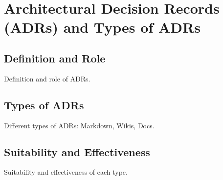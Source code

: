 
\chapter{Architectural Decision Records (ADRs) and Types of ADRs}
    \section{Definition and Role}
        Definition and role of ADRs.
    \section{Types of ADRs}
        Different types of ADRs: Markdown, Wikis, Docs.
    \section{Suitability and Effectiveness}
        Suitability and effectiveness of each type.